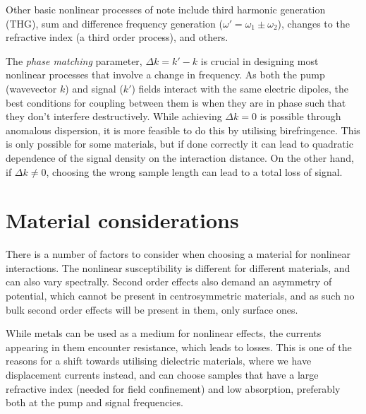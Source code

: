 \documentclass[12pt,a4paper]{article}
\begin{document}
Other basic nonlinear processes of note include third harmonic generation (THG), sum and difference frequency generation ($\omega'=\omega_1\pm\omega_2$), changes to the refractive index (a third order process), and others\cite{boydNonlinearOptics2008}.

The \emph{phase matching} parameter, $\Delta k = k'-k$ is crucial in designing most nonlinear processes that involve a change in frequency\cite{boydNonlinearOptics2008}. As both the pump (wavevector $k$) and signal ($k'$) fields interact with the same electric dipoles, the best conditions for coupling between them is when they are in phase such that they don't interfere destructively. While achieving $\Delta k=0$ is possible through anomalous dispersion, it is more feasible to do this by utilising birefringence\cite{raoNonlinearFrequencyConversion2004}. This is only possible for some materials, but if done correctly it can lead to quadratic dependence of the signal density on the interaction distance. On the other hand, if $\Delta k\neq 0$, choosing the wrong sample length can lead to a total loss of signal.

\section{Material considerations}
There is a number of factors to consider when choosing a material for nonlinear interactions. The nonlinear susceptibility is different for different materials\cite{burnsThirdHarmonicGenerationAbsorbing1971}, and can also vary spectrally\cite{carnemollaDegenerateOpticalNonlinear2018a}. Second order effects also demand an asymmetry of potential, which cannot be present in centrosymmetric materials, and as such no bulk second order effects will be present in them, only surface ones\cite{boydNonlinearOptics2008}.

While metals can be used as a medium for nonlinear effects, the currents appearing in them encounter resistance, which leads to losses. This is one of the reasons for a shift towards  utilising dielectric materials, where we have displacement currents instead\cite{krasnokAlldielectricOpticalNanoantennas2012,vandegroepDesigningDielectricResonators2013}, and can choose samples that have a large refractive index (needed for field confinement) and low absorption, preferably both at the pump and signal frequencies.
\end{document}

